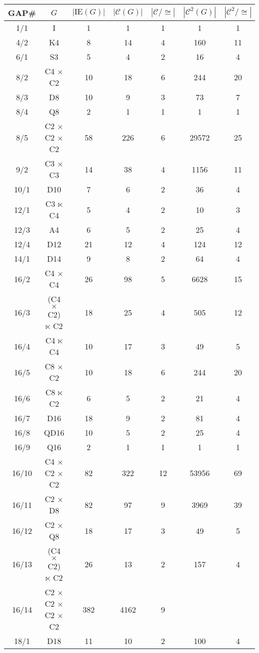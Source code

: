 \documentclass[a4paper,11pt]{article}
\theoremstyle{plain}
\theoremstyle{definition}
\begin{document}
\begin{longtable}{ccccccc}
	\hline\hline
	{\textsf{GAP}}\# & $G$ & $|\mathrm{IE}(G)|$ & $|\mathcal{C}(G)|$ & $|%
	\mathcal{C}/\cong |$ & $|\mathcal{C}^{2}(G)|$ & $|\mathcal{C}^{2}/\cong |$
	\\ \hline
	1/1 & I & 1 & 1 & 1 & 1 & 1 \\ 
	4/2 & K4 & 8 & 14 & 4 & 160 & 11 \\ 
	6/1 & S3 & 5 & 4 & 2 & 16 & 4 \\ 
	8/2 & C4 $\times $ C2 & 10 & 18 & 6 & 244 & 20 \\ 
	8/3 & D8 & 10 & 9 & 3 & 73 & 7 \\ 
	8/4 & Q8 & 2 & 1 & 1 & 1 & 1 \\ 
	8/5 & C2 $\times $ C2 $\times $ C2 & 58 & 226 & 6 & 29572 & 25 \\ 
	9/2 & C3 $\times $ C3 & 14 & 38 & 4 & 1156 & 11 \\ 
	10/1 & D10 & 7 & 6 & 2 & 36 & 4 \\ 
	12/1 & C3 $\ltimes $ C4 & 5 & 4 & 2 & 10 & 3 \\ 
	12/3 & A4 & 6 & 5 & 2 & 25 & 4 \\ 
	12/4 & D12 & 21 & 12 & 4 & 124 & 12 \\ 
	14/1 & D14 & 9 & 8 & 2 & 64 & 4 \\ 
	16/2 & C4 $\times $ C4 & 26 & 98 & 5 & 6628 & 15 \\ 
	16/3 & (C4 $\times $ C2) $\ltimes $ C2 & 18 & 25 & 4 & 505 & 12 \\ 
	16/4 & C4 $\ltimes $ C4 & 10 & 17 & 3 & 49 & 5 \\ 
	16/5 & C8 $\times $ C2 & 10 & 18 & 6 & 244 & 20 \\ 
	16/6 & C8 $\ltimes $ C2 & 6 & 5 & 2 & 21 & 4 \\ 
	16/7 & D16 & 18 & 9 & 2 & 81 & 4 \\ 
	16/8 & QD16 & 10 & 5 & 2 & 25 & 4 \\ 
	16/9 & Q16 & 2 & 1 & 1 & 1 & 1 \\ 
	16/10 & C4 $\times $ C2 $\times $ C2 & 82 & 322 & 12 & 53956 & 69 \\ 
	16/11 & C2 $\times $ D8 & 82 & 97 & 9 & 3969 & 39 \\ 
	16/12 & C2 $\times $ Q8 & 18 & 17 & 3 & 49 & 5 \\ 
	16/13 & (C4 $\times $ C2) $\ltimes $ C2 & 26 & 13 & 2 & 157 & 4 \\ 
	16/14 & C2 $\times $ C2 $\times $ C2 $\times $ C2 & 382 & 4162 & 9 &  &  \\ 
	18/1 & D18 & 11 & 10 & 2 & 100 & 4 \\ 

\end{longtable}
\end{document}
